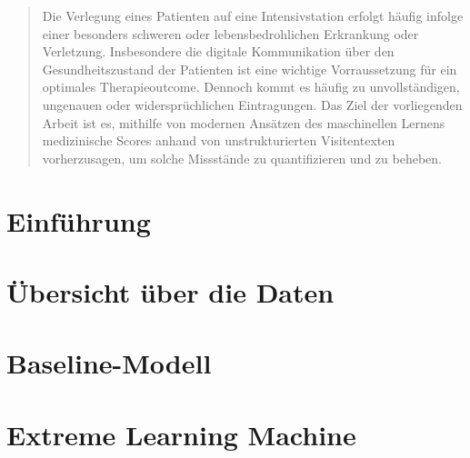 \documentclass[
	abstract=true, %
	a4paper, %
	12pt, %
	bibliography=totoc, %
	headinclude, %
	headsepline,
	draft, %
	twoside,
	BCOR=1mm, %
	open=right %
]{scrreprt}
\begin{document}
	\pagestyle{empty}

	\renewcommand{\arraystretch}{1.15} %


	

	\begin{abstract} \thispagestyle{plain} %
	Die Verlegung eines Patienten auf eine Intensivstation erfolgt häufig infolge einer besonders schweren oder lebensbedrohlichen Erkrankung oder Verletzung. Insbesondere die digitale Kommunikation über den Gesundheitszustand der Patienten ist eine wichtige Vorraussetzung für ein optimales Therapieoutcome. Dennoch kommt es häufig zu unvollständigen, ungenauen oder widersprüchlichen Eintragungen. Das Ziel der vorliegenden Arbeit ist es, mithilfe von modernen Ansätzen des maschinellen Lernens medizinische Scores anhand von unstrukturierten Visitentexten vorherzusagen, um solche Missstände zu quantifizieren und zu beheben.
	\end{abstract}

	\pagestyle{headings} %
	\tableofcontents

	\setlength{\parskip}{.25em} %

	\chapter{Einführung}
	
	
	\chapter{Übersicht über die Daten} %
	
	
	\chapter{Baseline-Modell}\label{chap-vorgehensweise}
	
	
	\chapter{Extreme Learning Machine}\label{chapter:ELM}
	
	
\end{document}
